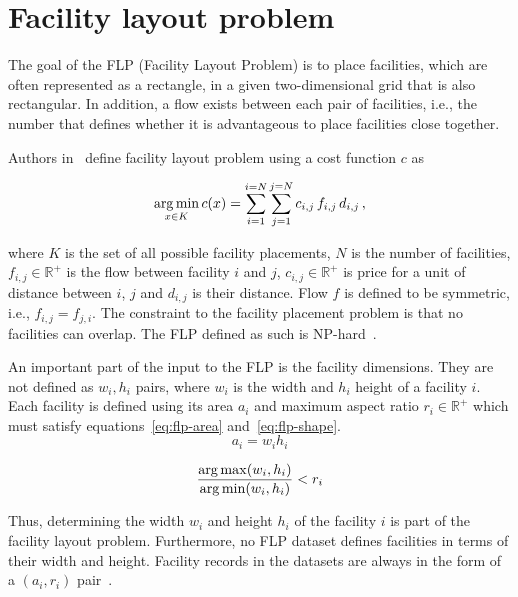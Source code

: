 \section{Facility layout problem}\label{sec:facility-layout-problem}

The goal of the FLP (Facility Layout Problem) is to place facilities, which are often represented as a rectangle,
in a given two-dimensional grid that is also rectangular.
In addition, a flow exists between each pair of facilities, i.e., the number that defines whether it is advantageous to place facilities close together.

Authors in~\cite{goncalvesBiasedRandomkeyGenetic2015} define facility layout problem using a cost function $c$ as

\begin{equation}
    \operatorname*{arg\,min}_{x \in K} c(x) = \sum\limits_{i=1}^{i=N}\sum\limits_{j=1}^{j=N}c_{i,j}\,f_{i,j}\,d_{i,j}\,,
    \label{eq:flp-objective}
\end{equation}

where $K$ is the set of all possible facility placements, $N$ is the number of facilities, $f_{i,j} \in \mathbb{R^+}$ is the flow between facility $i$ and $j$, $c_{i,j} \in \mathbb{R^+}$
is price for a unit of distance between $i$, $j$ and $d_{i,j}$ is their distance.
Flow $f$ is defined to be symmetric, i.e., $f_{i,j} = f_{j,i}$.
The constraint to the facility placement problem is that no facilities can overlap.
The FLP defined as such is NP-hard~\mbox{\cite{liuMultiobjectiveParticleSwarm2018, goncalvesBiasedRandomkeyGenetic2015, friedrichIntegratedSlicingTree2018}}.

An important part of the input to the FLP is the facility dimensions.
They are not defined as $w_i, h_i$ pairs, where $w_i$ is the width and $h_i$ height of a facility $i$.
Each facility is defined using its area $a_i$ and maximum aspect ratio $r_i \in \mathbb{R^+}$ which must satisfy equations~\ref{eq:flp-area} and~\ref{eq:flp-shape}.
\begin{equation}
    a_i = w_i h_i
    \label{eq:flp-area}
\end{equation}

\begin{equation}
    \dfrac{\operatorname*{arg\,max}(w_i, h_i)}{\operatorname*{arg\,min}(w_i, h_i)} < r_i
    \label{eq:flp-shape}
\end{equation}

Thus, determining the width $w_i$ and height $h_i$ of the facility $i$ is part of the facility layout problem.
Furthermore, no FLP dataset defines facilities in terms of their width and height.
Facility records in the datasets are always in the form of a $(a_i, r_i)$ pair~\cite{tamHierarchicalApproachFacility1991, dunkerCoevolutionaryAlgorithmFacility2003, liuSequencepairRepresentationMIPmodelbased2007}.

